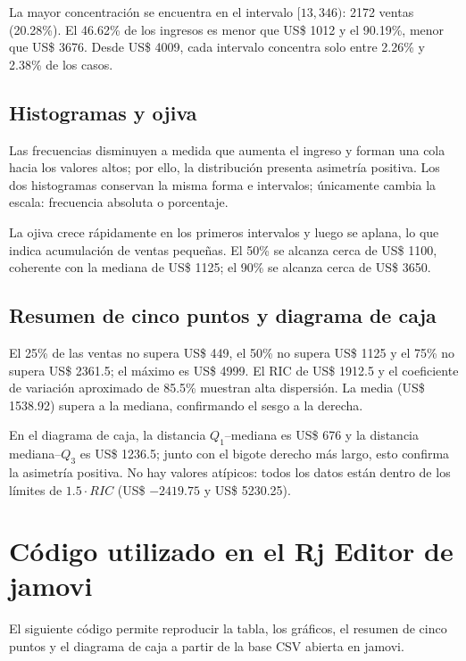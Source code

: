 \documentclass[12pt,letterpaper]{article}
\begin{document}
La mayor concentración se encuentra en el intervalo $[13,346)$: 2172 ventas (20.28\%). El 46.62\% de los ingresos es menor que US\$ 1012 y el 90.19\%, menor que US\$ 3676. Desde US\$ 4009, cada intervalo concentra solo entre 2.26\% y 2.38\% de los casos.

\subsection{Histogramas y ojiva}

Las frecuencias disminuyen a medida que aumenta el ingreso y forman una cola hacia los valores altos; por ello, la distribución presenta asimetría positiva. Los dos histogramas conservan la misma forma e intervalos; únicamente cambia la escala: frecuencia absoluta o porcentaje.

La ojiva crece rápidamente en los primeros intervalos y luego se aplana, lo que indica acumulación de ventas pequeñas. El 50\% se alcanza cerca de US\$ 1100, coherente con la mediana de US\$ 1125; el 90\% se alcanza cerca de US\$ 3650.

\subsection{Resumen de cinco puntos y diagrama de caja}

El 25\% de las ventas no supera US\$ 449, el 50\% no supera US\$ 1125 y el 75\% no supera US\$ 2361.5; el máximo es US\$ 4999. El RIC de US\$ 1912.5 y el coeficiente de variación aproximado de 85.5\% muestran alta dispersión. La media (US\$ 1538.92) supera a la mediana, confirmando el sesgo a la derecha.

En el diagrama de caja, la distancia $Q_1$--mediana es US\$ 676 y la distancia mediana--$Q_3$ es US\$ 1236.5; junto con el bigote derecho más largo, esto confirma la asimetría positiva. No hay valores atípicos: todos los datos están dentro de los límites de $1.5\cdot RIC$ (US\$ $-2419.75$ y US\$ 5230.25).

\appendix
\section{Código utilizado en el Rj Editor de jamovi}

El siguiente código permite reproducir la tabla, los gráficos, el resumen de cinco puntos y el diagrama de caja a partir de la base CSV abierta en jamovi.
\end{document}
